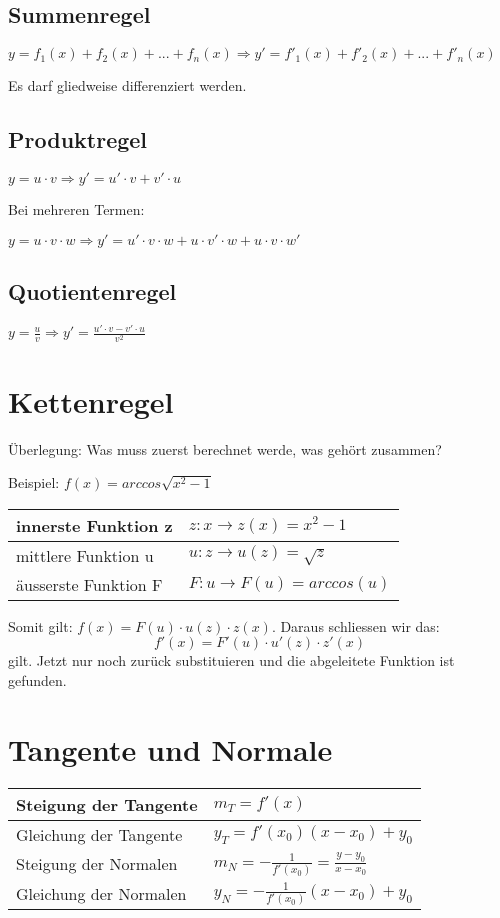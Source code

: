 \subsection{Summenregel}
\(y = f_1(x)+f_2(x)+ ... +f_n(x) \Rightarrow y'=f'_1(x) + f'_2(x)+...+f'_n(x)\)

Es darf gliedweise differenziert werden.
\subsection{Produktregel}
\(y=u \cdot v \Rightarrow y'=u' \cdot v + v' \cdot u\)

Bei mehreren Termen:

\(y=u \cdot v \cdot w \Rightarrow y'=u' \cdot v \cdot w + u \cdot v' \cdot w + u \cdot v \cdot w' \)
\subsection{Quotientenregel}
\(y = \frac{u}{v} \Rightarrow y' = \frac{u' \cdot v - v' \cdot u}{v^2}\)

\section{Kettenregel}
Überlegung: Was muss zuerst berechnet werde, was gehört zusammen?

Beispiel: \(f(x) = arccos \sqrt{x^2-1} \)
\newline
\begin{tabular}{|l|l|}
	\hline
   	innerste Funktion z & \(z: x \rightarrow z(x) = x^2-1\) \\
	\hline
	mittlere Funktion u & \(u: z \rightarrow u(z) = \sqrt{z}\) \\
	\hline
	äusserste Funktion F & \(F: u \rightarrow F(u) = arccos(u) \) \\
	\hline
 \end{tabular}\newline
Somit gilt: \( f(x) = F(u) \cdot u(z) \cdot z(x) \).\newline
 Daraus schliessen wir das:
\[ f'(x) = F'(u) \cdot u'(z) \cdot z'(x) \]
gilt. Jetzt nur noch zurück substituieren und die abgeleitete Funktion ist gefunden.

\section{Tangente und Normale}
\begin{longtable}{p{}|p{}}
	Steigung der Tangente & \(m_T=f'(x)\)\\
	\hline
	Gleichung der Tangente & \(y_T = f'(x_0)(x-x_0) + y_0 \)\\
	\hline
	Steigung der Normalen & \(m_N=-\frac{1}{f'(x_0)} = \frac{y-y_0}{x-x_0} \)\\
	\hline
	Gleichung der Normalen & \(y_N = - \frac{1}{f'(x_0)}(x-x_0) + y_0 \) \\
\end{longtable}


